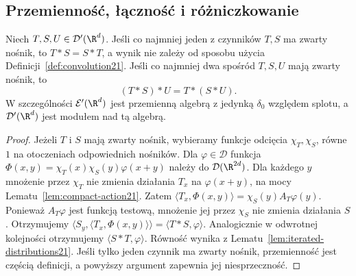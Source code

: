 \subsection{Przemienność, łączność i różniczkowanie}

\begin{twierdzenie}
\label{thm:convolution-algebra21}
Niech $T,S,U\in\mathcal D'(\R^d)$.
Jeśli co najmniej jeden z czynników $T,S$ ma zwarty nośnik,
to $T*S=S*T$, a wynik nie zależy od sposobu użycia
Definicji~\ref{def:convolution21}. Jeśli co najmniej dwa
spośród $T,S,U$ mają zwarty nośnik, to
\[
 (T*S)*U=T*(S*U).
\]
W szczególności $\mathcal E'(\R^d)$ jest przemienną
algebrą z jedynką $\delta_0$ względem splotu,
a $\mathcal D'(\R^d)$ jest modułem nad tą algebrą.
\end{twierdzenie}
\begin{proof}
Jeżeli $T$ i $S$ mają zwarty nośnik, wybieramy funkcje
odcięcia $\chi_T,\chi_S$, równe $1$ na otoczeniach
odpowiednich nośników. Dla $\varphi\in\mathcal D$ funkcja
$\Phi(x,y)=\chi_T(x)\chi_S(y)\varphi(x+y)$
należy do $\mathcal D(\R^{2d})$. Dla każdego $y$
mnożenie przez $\chi_T$ nie zmienia działania $T_x$
na $\varphi(x+y)$, na mocy Lematu~\ref{lem:compact-action21}.
Zatem $\langle T_x,\Phi(x,y)\rangle=\chi_S(y)A_T\varphi(y)$.
Ponieważ $A_T\varphi$ jest funkcją testową, mnożenie jej
przez $\chi_S$ nie zmienia działania $S$. Otrzymujemy
$\langle S_y,\langle T_x,\Phi(x,y)\rangle\rangle
=\langle T*S,\varphi\rangle$. Analogicznie w odwrotnej
kolejności otrzymujemy $\langle S*T,\varphi\rangle$.
Równość wynika z Lematu~\ref{lem:iterated-distributions21}.
Jeśli tylko jeden czynnik ma zwarty nośnik,
przemienność jest częścią definicji, a powyższy
argument zapewnia jej niesprzeczność.


\end{proof}
